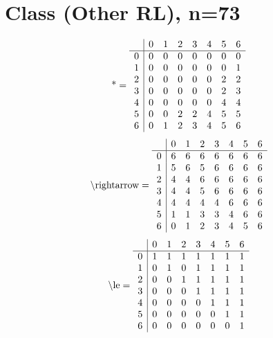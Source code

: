 \documentclass[11pt]{article}
\begin{document}
\section{Class (Other RL), n=73}
\[\text{*} = 
\begin{array}{r | r r r r r r r}
 & 0 & 1 & 2 & 3 & 4 & 5 & 6 \\ \hline
0 & 0 & 0 & 0 & 0 & 0 & 0 & 0 \\
1 & 0 & 0 & 0 & 0 & 0 & 0 & 1 \\
2 & 0 & 0 & 0 & 0 & 0 & 2 & 2 \\
3 & 0 & 0 & 0 & 0 & 0 & 2 & 3 \\
4 & 0 & 0 & 0 & 0 & 0 & 4 & 4 \\
5 & 0 & 0 & 2 & 2 & 4 & 5 & 5 \\
6 & 0 & 1 & 2 & 3 & 4 & 5 & 6 \\
\end{array}
\]
\[\text{\textbackslash rightarrow} = 
\begin{array}{r | r r r r r r r}
 & 0 & 1 & 2 & 3 & 4 & 5 & 6 \\ \hline
0 & 6 & 6 & 6 & 6 & 6 & 6 & 6 \\
1 & 5 & 6 & 5 & 6 & 6 & 6 & 6 \\
2 & 4 & 4 & 6 & 6 & 6 & 6 & 6 \\
3 & 4 & 4 & 5 & 6 & 6 & 6 & 6 \\
4 & 4 & 4 & 4 & 4 & 6 & 6 & 6 \\
5 & 1 & 1 & 3 & 3 & 4 & 6 & 6 \\
6 & 0 & 1 & 2 & 3 & 4 & 5 & 6 \\
\end{array}
\]
\[\text{\textbackslash le} = 
\begin{array}{r | r r r r r r r}
 & 0 & 1 & 2 & 3 & 4 & 5 & 6 \\ \hline
0 & 1 & 1 & 1 & 1 & 1 & 1 & 1 \\
1 & 0 & 1 & 0 & 1 & 1 & 1 & 1 \\
2 & 0 & 0 & 1 & 1 & 1 & 1 & 1 \\
3 & 0 & 0 & 0 & 1 & 1 & 1 & 1 \\
4 & 0 & 0 & 0 & 0 & 1 & 1 & 1 \\
5 & 0 & 0 & 0 & 0 & 0 & 1 & 1 \\
6 & 0 & 0 & 0 & 0 & 0 & 0 & 1 \\
\end{array}
\]
\end{document}
